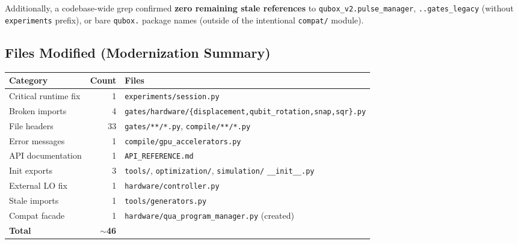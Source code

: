 \documentclass[11pt]{article}
\begin{document}
Additionally, a codebase-wide grep confirmed \textbf{zero remaining stale
references} to \texttt{qubox\_v2.pulse\_manager}, \texttt{..gates\_legacy}
(without \texttt{experiments} prefix), or bare \texttt{qubox.} package names
(outside of the intentional \texttt{compat/} module).

\subsection{Files Modified (Modernization Summary)}

\begin{longtable}{lrl}
\toprule
\textbf{Category} & \textbf{Count} & \textbf{Files} \\
\midrule
\endhead
Critical runtime fix     & 1  & \texttt{experiments/session.py} \\
Broken imports           & 4  & \texttt{gates/hardware/\{displacement,qubit\_rotation,snap,sqr\}.py} \\
File headers             & 33 & \texttt{gates/**/*.py}, \texttt{compile/**/*.py} \\
Error messages           & 1  & \texttt{compile/gpu\_accelerators.py} \\
API documentation        & 1  & \texttt{API\_REFERENCE.md} \\
Init exports             & 3  & \texttt{tools/}, \texttt{optimization/}, \texttt{simulation/} \texttt{\_\_init\_\_.py} \\
External LO fix          & 1  & \texttt{hardware/controller.py} \\
Stale imports            & 1  & \texttt{tools/generators.py} \\
Compat facade            & 1  & \texttt{hardware/qua\_program\_manager.py} (created) \\
\midrule
\textbf{Total}           & \textbf{$\sim$46} & \\
\bottomrule
\end{longtable}
\end{document}
